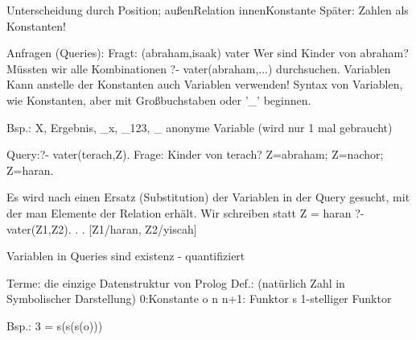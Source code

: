 \documentclass[11pt]{scrartcl}
\begin{document}
Unterscheidung durch Position;
	außen\rightarrow Relation
	innen\rightarrow Konstante
	Später: Zahlen als Konstanten!
	

Anfragen (Queries):
Fragt: (abraham,isaak) \in vater
Wer sind Kinder von abraham?
Müssten wir alle Kombinationen ?- vater(abraham,...) durchsuchen.
 Variablen
Kann anstelle der Konstanten auch Variablen verwenden!
Syntax von Variablen, wie Konstanten, aber mit Großbuchstaben oder '_' beginnen.

Bsp.: X, Ergebnis, _x, _123, _
							\nwarrow anonyme Variable (wird nur 1 mal gebraucht)

Query:?- vater(terach,Z).
Frage: Kinder von terach?
Z=abraham;
Z=nachor;
Z=haran.

Es wird nach einen Ersatz (Substitution) der Variablen in der Query gesucht, mit der man Elemente der Relation erhält.
Wir schreiben statt Z = haran \rightarrow [Z/haran]
?- vater(Z1,Z2)
									.
									.
									.
							[Z1/haran, Z2/yiscah]
							
Variablen in Queries sind existenz - quantifiziert

Terme: die einzige Datenstruktur von Prolog
Def.: (natürlich Zahl in Symbolischer Darstellung)
		0\in {}:Konstante o
		n\in {} \Rightarrow n+1\in {}: Funktor s 1-stelliger Funktor

Bsp.: 3 = s(s(s(o)))
\end{document}
